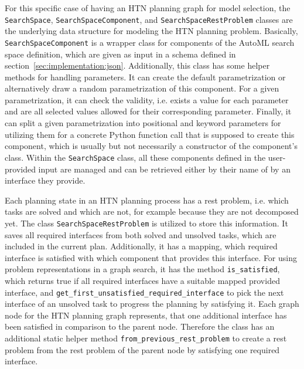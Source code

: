 For this specific case of having an HTN planning graph for model selection, the \texttt{SearchSpace}, \texttt{SearchSpaceComponent}, and \texttt{SearchSpaceRestProblem} classes are the underlying data structure for modeling the HTN planning problem.\newline
Basically, \texttt{SearchSpaceComponent} is a wrapper class for components of the AutoML search space definition, which are given as input in a schema defined in section~\ref{sec:implementation:json}.
Additionally, this class has some helper methods for handling parameters.
It can create the default parametrization or alternatively draw a random parametrization of this component.
For a given parametrization, it can check the validity, i.e. exists a value for each parameter and are all selected values allowed for their corresponding parameter.
Finally, it can split a given parametrization into positional and keyword parameters for utilizing them for a concrete Python function call that is supposed to create this component, which is usually but not necessarily a constructor of the component's class.\newline
Within the \texttt{SearchSpace} class, all these components defined in the user-provided input are managed and can be retrieved either by their name of by an interface they provide.

Each planning state in an HTN planning process has a rest problem, i.e. which tasks are solved and which are not, for example because they are not decomposed yet.
The class \texttt{SearchSpaceRestProblem} is utilized to store this information.
It saves all required interfaces from both solved and unsolved tasks, which are included in the current plan.
Additionally, it has a mapping, which required interface is satisfied with which component that provides this interface.\newline
For using problem representations in a graph search, it has the method \texttt{is\_satisfied}, which returns true if all required interfaces have a suitable mapped provided interface, and \texttt{get\_first\_unsatisfied\_required\_interface} to pick the next interface of an unsolved task to progress the planning by satisfying it.
Each graph node for the HTN planning graph represents, that one additional interface has been satisfied in comparison to the parent node.
Therefore the class has an additional static helper method \texttt{from\_previous\_rest\_problem} to create a rest problem from the rest problem of the parent node by satisfying one required interface.

